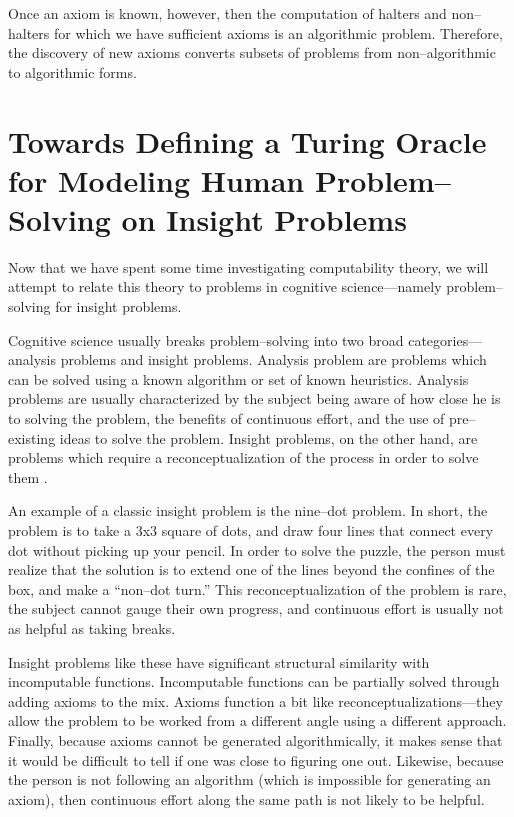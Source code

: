 Once an axiom is known, however, then the computation of halters and non--halters for which we have sufficient axioms is an algorithmic problem.  Therefore, the discovery of new axioms converts subsets of problems from non--algorithmic to algorithmic forms.

\section{Towards Defining a Turing Oracle for Modeling Human Problem--Solving on Insight Problems}

Now that we have spent some time investigating computability theory, we will attempt to relate this theory to problems in cognitive science---namely problem--solving for insight problems.

Cognitive science usually breaks problem--solving into two broad categories---analysis problems and insight problems.  Analysis problem are problems which can be solved using a known algorithm or set of known heuristics.  Analysis problems are usually characterized by the subject being aware of how close he is to solving the problem, the benefits of continuous effort, and the use of pre--existing ideas to solve the problem.  Insight problems, on the other hand, are problems which require a reconceptualization of the process in order to solve them \cite{chronicleetal2004}. 

An example of a classic insight problem is the nine--dot problem.  In short, the problem is to take a 3x3 square of dots, and draw four lines that connect every dot without picking up your pencil.  In order to solve the puzzle, the person must realize that the solution is to extend one of the lines beyond the confines of the box, and make a ``non--dot turn.''  This reconceptualization of the problem is rare, the subject cannot gauge their own progress, and continuous effort is usually not as helpful as taking breaks.

Insight problems like these have significant structural similarity with incomputable functions.  Incomputable functions can be partially solved through adding axioms to the mix.  Axioms function a bit like reconceptualizations---they allow the problem to be worked from a different angle using a different approach.  Finally, because axioms cannot be generated algorithmically, it makes sense that it would be difficult to tell if one was close to figuring one out.  Likewise, because the person is not following an algorithm (which is impossible for generating an axiom), then continuous effort along the same path is not likely to be helpful.

